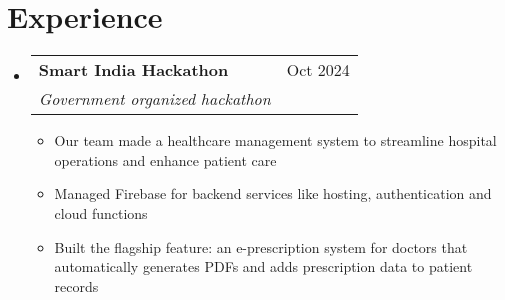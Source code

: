 \documentclass[letterpaper,11pt]{article}
\makeatletter
\newcommand{\resumeItem}[1]{
  \item\small{
    {#1 \vspace{-5pt}}
  }
}
\newcommand{\resumeSubheading}[4]{
  \vspace{-2pt}\item
    \begin{tabular*}{0.97\textwidth}[t]{l@{\extracolsep{\fill}}r}
      \textbf{#1} & #2 \\
      \textit{\small#3} & \textit{\small #4} \\
    \end{tabular*}\vspace{-7pt}
}
\newcommand{\resumeSubHeadingListStart}{\begin{itemize}[leftmargin=0.15in, label={}]}
\newcommand{\resumeSubHeadingListEnd}{\end{itemize}}
\newcommand{\resumeItemListStart}{\begin{itemize}}
\newcommand{\resumeItemListEnd}{\end{itemize}\vspace{3pt}}
\makeatother
\begin{document}
\section{Experience}
  \resumeSubHeadingListStart

\begin{comment}
    \resumeSubheading
      {Internlay}{Nov 2024}
      {College competition}{}
      \resumeItemListStart
        \resumeItem{Our team aimed to create an all-in-one solution for the management and coordination of various aspects of college sports}
        \resumeItem{Implemented user authentication, ensuring that only organization users could sign in and access the system}
        \resumeItem{Collaborated with team to implement various API routes for core functionality, such as managing sports events and scheduling}
    \resumeItemListEnd
\end{comment}

    \resumeSubheading
      {Smart India Hackathon}{Oct 2024}
      {Government organized hackathon}{}
      \resumeItemListStart
        \resumeItem{Our team made a healthcare management system to streamline hospital operations and enhance patient care}
        \resumeItem{Managed Firebase for backend services like hosting, authentication and cloud functions}
        \resumeItem{Built the flagship feature: an e-prescription system for doctors that automatically generates PDFs and adds prescription data to patient records}
      \resumeItemListEnd

  \resumeSubHeadingListEnd


\end{document}
